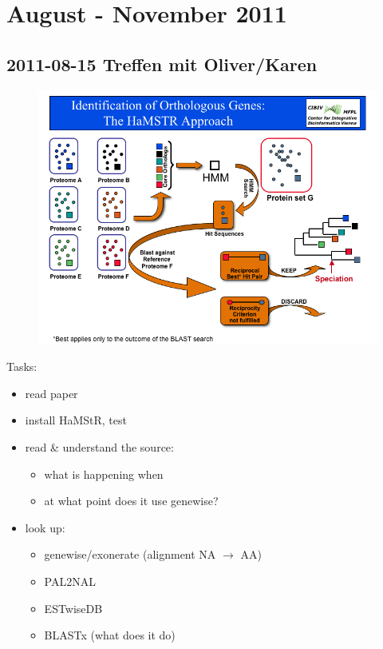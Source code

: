 \section{August - November 2011}
\subsection*{2011-08-15 Treffen mit Oliver/Karen}

\begin{figure}[h]
	\includegraphics[width=\textwidth]{img/hamstr-schema}
	\caption{\cite{Ebersberger2009}}
\end{figure}

Tasks:

\begin{itemize}
	\item read paper
	\item install HaMStR, test
	\item read \& understand the source:
		\begin{itemize}
			\item what is happening when
			\item at what point does it use genewise?
		\end{itemize}
	\item look up:
		\begin{itemize}
		\item genewise/exonerate (alignment NA $\rightarrow$ AA)
			\item PAL2NAL
			\item ESTwiseDB
			\item BLASTx (what does it do)
		\end{itemize}
\end{itemize}

